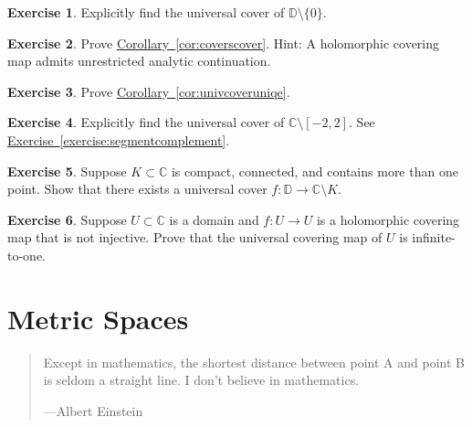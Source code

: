 \documentclass[12pt,openany]{book}
\newcommand{\C}{{\mathbb{C}}}
\newcommand{\D}{{\mathbb{D}}}
\theoremstyle{plain}
\theoremstyle{remark}
\theoremstyle{definition}
\newenvironment{exbox}{%
    \def\FrameCommand{\vrule width 1pt \relax\hspace{10pt}}%
    \MakeFramed{\advance\hsize-\width\FrameRestore}%
}{%
    \endMakeFramed
}
\newenvironment{myepigraph}{%
    \begin{quote}%
    \begingroup\itshape
}{%
    \endgroup%
    \end{quote}
}
\theoremstyle{exercise}
\newtheorem{exercise}{Exercise}[section]
\theoremstyle{example}
\newcommand{\exerciseref}[1]{\hyperref[#1]{Exercise~\ref*{#1}}}
\newcommand{\corref}[1]{\hyperref[#1]{Corollary~\ref*{#1}}}
\begin{document}
\begin{exbox}
\begin{exercise}
Explicitly find the universal cover of $\D \setminus \{ 0 \}$.
\end{exercise}

\begin{exercise}
Prove \corref{cor:coverscover}.  Hint: A holomorphic covering map
admits unrestricted analytic continuation.
\end{exercise}

\begin{exercise}
Prove \corref{cor:univcoveruniqe}.
\end{exercise}

\begin{exercise}
Explicitly find the universal cover of $\C \setminus [-2,2]$.
See \exerciseref{exercise:segmentcomplement}.
\end{exercise}

\begin{exercise}
Suppose $K \subset \C$ is compact, connected, and contains more than one
point.  Show that there
exists a universal cover $f \colon \D \to \C \setminus K$.
\end{exercise}

\begin{exercise}
Suppose $U \subset \C$ is a domain and $f \colon U \to U$ is a holomorphic
covering map that is not injective.  Prove that the universal covering map
of $U$ is infinite-to-one.
\end{exercise}
\end{exbox}


\appendix


\chapter{Metric Spaces} \label{ap:metric}

\begin{myepigraph}
Except in mathematics, the shortest distance between point A and point B is seldom a straight line. I don't believe in mathematics.

---Albert Einstein
\end{myepigraph}
\end{document}
